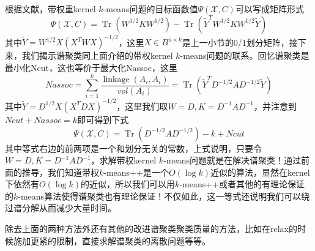 根据文献\cite{dhillon2004unified}，带权重kernel $k$-means问题的目标函数值$\Psi(\mathcal{X},C)$可以写成矩阵形式
\begin{equation*}
	\Psi(\mathcal{X},C) = \operatorname{Tr}\left(W^{1 / 2} K W^{1 / 2}\right)-\operatorname{Tr}\left(\tilde{Y}^{T} W^{1 / 2} K W^{1 / 2} \tilde{Y}\right)
\end{equation*}
其中$\tilde{Y} = W^{1/2}X(X^TWX)^{-1/2}$，这里$X\in B^{n\times k}$是上一小节的0/1划分矩阵，接下来，我们揭示谱聚类同上面介绍的带权kernel $k$-means问题的联系。回忆谱聚类是最小化Ncut，这也等价于最大化Nassoc，这里
\begin{equation*}
	Nassoc=\sum_{i=1}^k \frac{\operatorname{linkage}(A_i,A_i)}{vol(A_i)} = \operatorname{Tr}(\tilde{Y}^TD^{-1/2}AD^{-1/2}\tilde{Y})
\end{equation*}
其中$\tilde{Y} = D^{1/2}X(X^TDX)^{-1/2}$，这里我们取$W=D,K=D^{-1}AD^{-1}$，并注意到$Ncut+Nassoc=k$即可得到下式
\begin{equation}
	\label{eq: wkk_spectral_clustering}
	\Psi(\mathcal{X},C) = \operatorname{Tr}\left(D^{-1 / 2} A D^{-1 / 2}\right) - k + Ncut
\end{equation}
其中等式右边的前两项是一个和划分无关的常数，上式说明，只要令$W=D,K=D^{-1}AD^{-1}$，求解带权kernel $k$-means问题就是在解决谱聚类！通过前面的推导，我们知道带权$k$-means++是一个$O(\log k)$近似的算法，显然在kernel下依然有$O(\log k)$的近似，所以我们可以用$k$-means++或者其他的有理论保证的$k$-means算法使得谱聚类也有理论保证！不仅如此，这一等式还说明我们可以绕过谱分解从而减少大量时间。

除去上面的两种方法外还有其他的改进谱聚类聚类质量的方法，比如在relax的时候施加更紧的限制，直接求解谱聚类的离散问题等等。

